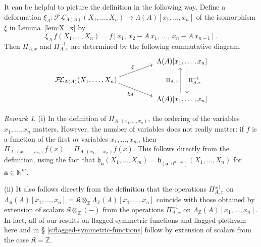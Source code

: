 \documentclass[12pt]{amsart}
\theoremstyle{definition}
\theoremstyle{remark}
\newtheorem{remark}[thm]{Remark}
\newcommand{\NN}{{\mathbb N}}
\newcommand{\ZZ}{{\mathbb Z}}
\newcommand{\aA}{{\mathbf a}}
\newcommand{\fh}{{\mathfrak h}}
\newcommand{\Kfrak}{{\mathfrak K}}
\newcommand{\FLambda}{\mathcal{F\!L}}
\begin{document}
It can be helpful to picture the definition in the following way.
Define a deformation $\xi _{A} \colon \FLambda _{\Lambda (A)}
(X_{1},\ldots,X_{n}) \rightarrow \Lambda (A) [x_{1},\ldots,x_{n}]$ of
the isomorphism $\xi $ in Lemma~\ref{lem:X=x} by
\begin{equation}\label{e:xi-A}
\xi _{A}\, f(X_{1},\ldots,X_{n}) = f[x_{1},\, x_{2}-A\, x_{1},\,
\ldots,\, x_{n}-A\, x_{n-1}].
\end{equation}
Then $\Pi  _{A,x}$ and $\Pi  _{A,x}^{-1}$ are determined by the
following commutative diagram.
\begin{equation}\label{e:cd-for-PiA}
\begin{tikzcd}[row sep=small]
&&
\mbox{$\Lambda (A)[x_{1},\ldots,x_{n}]$}
\arrow[dd, shift left=3, "\Pi _{A,x}^{-1}"]
\\
\mbox{$\FLambda _{\Lambda (A)} (X_{1},\ldots,X_{n})$}
\arrow[urr, shift left=2, start anchor=east, end anchor=south west, "\xi "]
\arrow[drr, shift right=2, start anchor=east, end anchor=north west,
   "\xi _{A}"']
\\
&&
\mbox{$\Lambda (A)[x_{1},\ldots,x_{n}]$}
\arrow[uu, shift left=1, "\Pi _{A,x}"]
\end{tikzcd}
\end{equation}

\begin{remark}\label{rem:PiA-clarifications}
(i) In the definition of $\Pi _{A,(x_{1},\ldots,x_{n})}$, the ordering
of the variables $x_{1},\ldots,x_{n}$ matters.  However, the number of
variables does not really matter: if $f$ is a function of the first
$m$ variables $x_{1},\ldots,x_{m}$, then $\Pi
_{A,(x_{1},\ldots,x_{m})} f(x) = \Pi _{A,(x_{1},\ldots,x_{n})} f(x)$.
This follows directly from the definition, using the fact that
${\fh}_{\aA}(X_{1},\ldots,X_{m}) = {\fh}_{(\aA;\,
0^{n-m})}(X_{1},\ldots,X_{n})$ for $\aA \in \NN ^{m}$.

(ii) It also follows directly from the definition that the operations
$\Pi _{A,x}^{\pm 1}$ on $\Lambda _{\Kfrak }(A)[x_{1},\ldots,x_{n}] =
\Kfrak \otimes _{\ZZ } \Lambda _{\ZZ }(A)[x_{1},\ldots,x_{n}]$
coincide with those obtained by extension of scalars $\Kfrak \otimes
_{\ZZ } (-)$ from the operations $\Pi _{A,x}^{\pm 1}$ on $\Lambda
_{\ZZ }(A)[x_{1},\ldots,x_{n}]$.  In fact, all of our results on
flagged symmetric functions and flagged plethysm here and in \S
\ref{s:flagged-symmetric-functions} follow by extension of scalars
from the case $\Kfrak =\ZZ $.
\end{remark}
\end{document}

